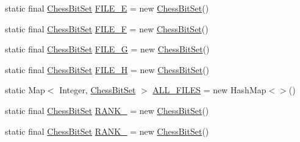 \begin{DoxyCompactItemize}
\item 
static final \mbox{\hyperlink{classcom_1_1chess_1_1engine_1_1bitboards_1_1_chess_bit_set}{Chess\+Bit\+Set}} \mbox{\hyperlink{classcom_1_1chess_1_1engine_1_1bitboards_1_1_bit_board_a126875f362198ebcccb1794dda45c597}{F\+I\+L\+E\+\_\+E}} = new \mbox{\hyperlink{classcom_1_1chess_1_1engine_1_1bitboards_1_1_chess_bit_set}{Chess\+Bit\+Set}}()
\item 
static final \mbox{\hyperlink{classcom_1_1chess_1_1engine_1_1bitboards_1_1_chess_bit_set}{Chess\+Bit\+Set}} \mbox{\hyperlink{classcom_1_1chess_1_1engine_1_1bitboards_1_1_bit_board_ac1289af8038d4cbc19a4f4b2af8d51be}{F\+I\+L\+E\+\_\+F}} = new \mbox{\hyperlink{classcom_1_1chess_1_1engine_1_1bitboards_1_1_chess_bit_set}{Chess\+Bit\+Set}}()
\item 
static final \mbox{\hyperlink{classcom_1_1chess_1_1engine_1_1bitboards_1_1_chess_bit_set}{Chess\+Bit\+Set}} \mbox{\hyperlink{classcom_1_1chess_1_1engine_1_1bitboards_1_1_bit_board_a390d7db81c0bd453b95ccd7cc06d373c}{F\+I\+L\+E\+\_\+G}} = new \mbox{\hyperlink{classcom_1_1chess_1_1engine_1_1bitboards_1_1_chess_bit_set}{Chess\+Bit\+Set}}()
\item 
static final \mbox{\hyperlink{classcom_1_1chess_1_1engine_1_1bitboards_1_1_chess_bit_set}{Chess\+Bit\+Set}} \mbox{\hyperlink{classcom_1_1chess_1_1engine_1_1bitboards_1_1_bit_board_a001430ba2429224afb9d4ef5df91d849}{F\+I\+L\+E\+\_\+H}} = new \mbox{\hyperlink{classcom_1_1chess_1_1engine_1_1bitboards_1_1_chess_bit_set}{Chess\+Bit\+Set}}()
\item 
static Map$<$ Integer, \mbox{\hyperlink{classcom_1_1chess_1_1engine_1_1bitboards_1_1_chess_bit_set}{Chess\+Bit\+Set}} $>$ \mbox{\hyperlink{classcom_1_1chess_1_1engine_1_1bitboards_1_1_bit_board_a15c38265aa865860fa7a91fbfb48ec8e}{A\+L\+L\+\_\+\+F\+I\+L\+ES}} = new Hash\+Map$<$$>$()
\item 
static final \mbox{\hyperlink{classcom_1_1chess_1_1engine_1_1bitboards_1_1_chess_bit_set}{Chess\+Bit\+Set}} \mbox{\hyperlink{classcom_1_1chess_1_1engine_1_1bitboards_1_1_bit_board_a87f2b1cc5fb80a0292612747f8689599}{R\+A\+N\+K\+\_}} = new \mbox{\hyperlink{classcom_1_1chess_1_1engine_1_1bitboards_1_1_chess_bit_set}{Chess\+Bit\+Set}}()
\item 
static final \mbox{\hyperlink{classcom_1_1chess_1_1engine_1_1bitboards_1_1_chess_bit_set}{Chess\+Bit\+Set}} \mbox{\hyperlink{classcom_1_1chess_1_1engine_1_1bitboards_1_1_bit_board_a005b14157148e3131ddf3f62de20c973}{R\+A\+N\+K\+\_}} = new \mbox{\hyperlink{classcom_1_1chess_1_1engine_1_1bitboards_1_1_chess_bit_set}{Chess\+Bit\+Set}}()
$$
\end{DoxyCompactItemize}
